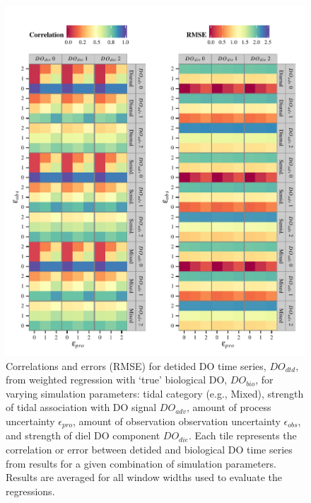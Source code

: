 \documentclass[letterpaper,12pt,oneside]{article}\usepackage[]{graphicx}\usepackage[]{color}
\makeatletter
\def\maxwidth{ %
  \ifdim\Gin@nat@width>\linewidth
    \linewidth
  \else
    \Gin@nat@width
  \fi
}
\newenvironment{knitrout}{}{} %
\makeatother
\begin{document}
\centering\vspace*{\fill}
\begin{knitrout}
\color{fgcolor}\begin{figure}[!ht]


{\centering \includegraphics[width=\maxwidth]{figure/err_surf1} 

}

\caption[Correlations and errors (\ac{RMSE}) for detided \ac{DO} time series, $DO_{dtd}$, from weighted regression with `true' biological \ac{DO}, $DO_{bio}$, for varying simulation parameters]{Correlations and errors (\ac{RMSE}) for detided \ac{DO} time series, $DO_{dtd}$, from weighted regression with `true' biological \ac{DO}, $DO_{bio}$, for varying simulation parameters: tidal category (e.g., Mixed), strength of tidal association with \ac{DO} signal $DO_{adv}$, amount of process uncertainty $\epsilon_{pro}$, amount of observation observation uncertainty $\epsilon_{obs}$, and strength of diel \ac{DO} component $DO_{die}$.  Each tile represents the correlation or error between detided and biological \ac{DO} time series from results for a given combination of simulation parameters.  Results are averaged for all window widths used to evaluate the regressions.\label{fig:err_surf1}}
\end{figure}


\end{knitrout}
\vfill
\clearpage
\end{document}

